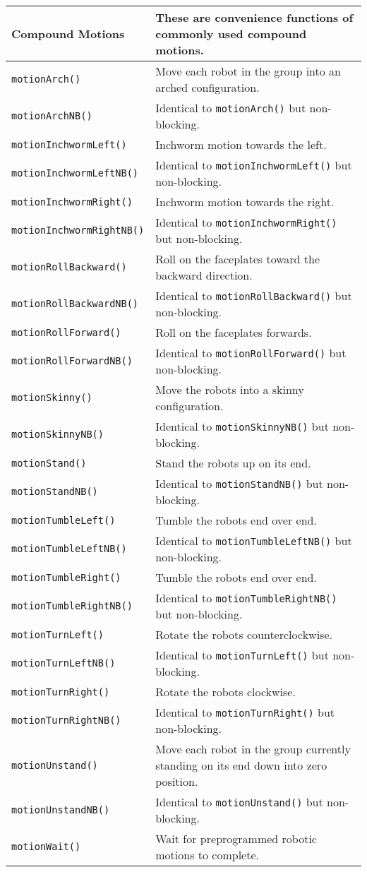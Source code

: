 \begin{tabular}{p{1.75in}p{4.5in}}
Compound Motions & These are convenience functions of commonly used compound motions. \\
\hline
\texttt{motionArch()}  & Move each robot in the group into an arched configuration. \\
\texttt{motionArchNB()}  & Identical to \texttt{motionArch()} but non-blocking. \\
\texttt{motionInchwormLeft()}  & Inchworm motion towards the left. \\
\texttt{motionInchwormLeftNB()}  & Identical to \texttt{motionInchwormLeft()} but non-blocking. \\
\texttt{motionInchwormRight()}  & Inchworm motion towards the right. \\
\texttt{motionInchwormRightNB()}  & Identical to \texttt{motionInchwormRight()} but non-blocking. \\
\texttt{motionRollBackward()}  & Roll on the faceplates toward the backward direction. \\
\texttt{motionRollBackwardNB()}  & Identical to \texttt{motionRollBackward()} but non-blocking. \\
\texttt{motionRollForward()}  & Roll on the faceplates forwards. \\
\texttt{motionRollForwardNB()}  & Identical to \texttt{motionRollForward()} but non-blocking. \\
\texttt{motionSkinny()}  & Move the robots into a skinny configuration. \\
\texttt{motionSkinnyNB()}  & Identical to \texttt{motionSkinnyNB()} but non-blocking. \\
\texttt{motionStand()}  & Stand the robots up on its end. \\
\texttt{motionStandNB()}  & Identical to \texttt{motionStandNB()} but non-blocking. \\
\texttt{motionTumbleLeft()}  & Tumble the robots end over end. \\
\texttt{motionTumbleLeftNB()}  & Identical to \texttt{motionTumbleLeftNB()} but non-blocking. \\
\texttt{motionTumbleRight()}  & Tumble the robots end over end. \\
\texttt{motionTumbleRightNB()}  & Identical to \texttt{motionTumbleRightNB()} but non-blocking. \\
\texttt{motionTurnLeft()}  & Rotate the robots counterclockwise. \\
\texttt{motionTurnLeftNB()}  & Identical to \texttt{motionTurnLeft()} but non-blocking. \\
\texttt{motionTurnRight()}  & Rotate the robots clockwise. \\
\texttt{motionTurnRightNB()}  & Identical to \texttt{motionTurnRight()} but non-blocking. \\
\texttt{motionUnstand()}  & Move each robot in the group currently standing on its end down into zero position. \\
\texttt{motionUnstandNB()}  & Identical to \texttt{motionUnstand()} but non-blocking. \\
\texttt{motionWait()}  & Wait for preprogrammed robotic motions to complete. \\
\hline
\end{tabular}
